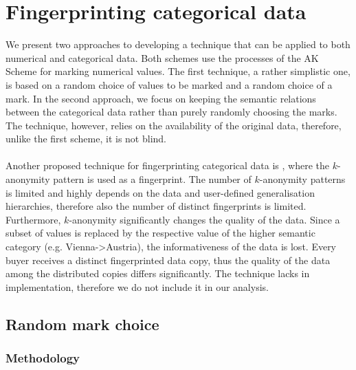 \section{Fingerprinting categorical data}\label{subsec:fingerprinting-scheme-categorical}

We present two approaches to developing a technique that can be applied to both numerical and categorical data.
Both schemes use the processes of the AK Scheme for marking numerical values.
The first technique, a rather simplistic one, is based on a random choice of values to be marked and a random choice of a mark. 
In the second approach, we focus on keeping the semantic relations between the categorical data rather than purely randomly choosing the marks. 
The technique, however, relies on the availability of the original data, therefore, unlike the first scheme, it is not blind.
\paragraph{}
Another proposed technique for fingerprinting categorical data is \cite{Kieseberg2014fingerprinting}, where the $k$-anonymity pattern is used as a fingerprint. 
The number of $k$-anonymity patterns is limited and highly depends on the data and user-defined generalisation hierarchies, therefore also the number of distinct fingerprints is limited.
Furthermore, $k$-anonymity significantly changes the quality of the data. 
Since a subset of values is replaced by the respective value of the higher semantic category (e.g. Vienna->Austria), the informativeness of the data is lost.
Every buyer receives a distinct fingerprinted data copy, thus the quality of the data among the distributed copies differs significantly.
The technique lacks in implementation, therefore we do not include it in our analysis.

\subsection{Random mark choice}
\subsubsection{Methodology}

